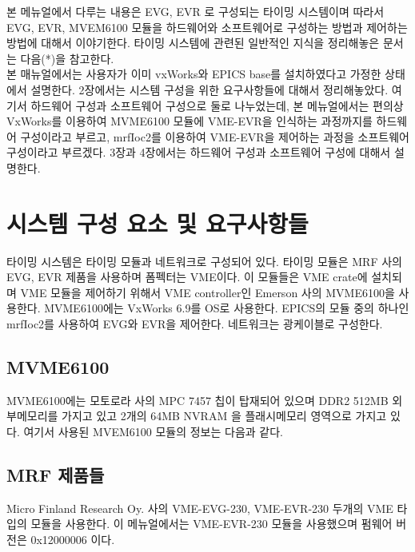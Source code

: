 \documentclass[11pt,a4paper]{article}
\begin{document}
본 메뉴얼에서 다루는 내용은 EVG, EVR 로 구성되는 타이밍 시스템이며 따라서
EVG, EVR, MVEM6100 모듈을 하드웨어와 소프트웨어로 구성하는 방법과 제어하는 방법에 대해서 이야기한다.
타이밍 시스템에 관련된 일반적인 지식을 정리해놓은 문서는 다음(*)을 참고한다.
\\

본 매뉴얼에서는 사용자가 이미 vxWorks와 EPICS base를 설치하였다고 가정한 상태에서 설명한다.
2장에서는 시스템 구성을 위한 요구사항들에 대해서 정리해놓았다.
여기서 하드웨어 구성과 소프트웨어 구성으로 둘로 나누었는데,
본 메뉴얼에서는 편의상 VxWorks를 이용하여 MVME6100 모듈에 VME-EVR을 인식하는 과정까지를 하드웨어 구성이라고 부르고,
mrfIoc2를 이용하여 VME-EVR을 제어하는 과정을 소프트웨어 구성이라고 부르겠다.
3장과 4장에서는 하드웨어 구성과 소프트웨어 구성에 대해서 설명한다.


\section{시스템 구성 요소 및 요구사항들}
\vspace{0.5em}
타이밍 시스템은 타이밍 모듈과 네트워크로 구성되어 있다.
타이밍 모듈은 MRF 사의 EVG, EVR 제품을 사용하며 폼펙터는 VME이다.
이 모듈들은 VME crate에 설치되며 VME 모듈을 제어하기 위해서 VME controller인 
Emerson 사의 MVME6100을 사용한다.
MVME6100에는 VxWorks 6.9를 OS로 사용한다.
EPICS의 모듈 중의 하나인 mrfIoc2를 사용하여 EVG와 EVR을 제어한다.
네트워크는 광케이블로 구성한다. 

\subsection{MVME6100}
MVME6100에는 모토로라 사의 MPC 7457 칩이 탑재되어 있으며 DDR2 512MB 외부메모리를 가지고 있고
2개의 64MB NVRAM 을 플래시메모리 영역으로 가지고 있다. 여기서 사용된  MVEM6100 모듈의 정보는 다음과 같다.

\subsection{MRF 제품들}
Micro Finland Research Oy. 사의 VME-EVG-230, VME-EVR-230 두개의 VME 타입의 모듈을 사용한다.
이 메뉴얼에서는 VME-EVR-230 모듈을 사용했으며 펌웨어 버전은 0x12000006 이다.
\end{document}
